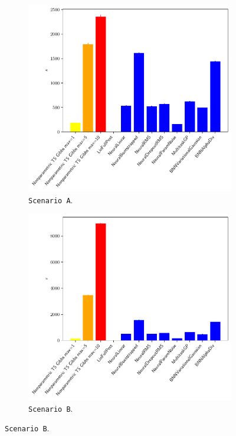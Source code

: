 \begin{figure}[!h]
	\centering
	\begin{subfigure}[c]{0.45\textwidth}
		\includegraphics[width=\textwidth]{./figs/linear_gaussian_mixture_easy/exec_time_barplot}
		\vspace*{-5ex}
		\caption{\texttt{Scenario A}.}
		\label{afig:scenario_A_exec_times}
	\end{subfigure}
	\begin{subfigure}[c]{0.45\textwidth}
		\includegraphics[width=\textwidth]{./figs/linear_gaussian_mixture_hard/exec_time_barplot}
		\vspace*{-5ex}
		\caption{\texttt{Scenario B}.}
		\label{afig:scenario_B_exec_times}
	\end{subfigure}
	

\end{figure}

